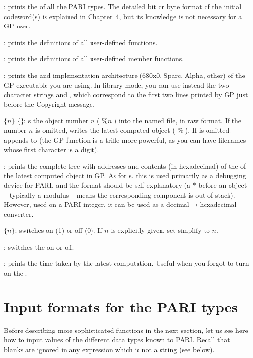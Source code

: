: prints the  of all the PARI
types. The detailed bit or byte format of the initial codeword(s) is
explained in Chapter~4, but its knowledge is not necessary for a GP user.

: prints the definitions of all user-defined functions.

: prints the definitions of all user-defined member functions.

: prints the  and implementation architecture
(680x0, Sparc, Alpha, other) of the GP executable you are using. In library
mode, you can use instead the two character strings  and
, which correspond to the first two lines printed by GP just
before the Copyright message.

 $\{n\}$ $\{$$\}$: s the object number
$n$ ( $\%n$ ) into the named file, in raw format. If the number $n$ is
omitted, writes the latest computed object ( $\%$ ). If  is
omitted, appends to  (the GP function  is a trifle more
powerful, as you can have filenames whose first character is a digit).

: prints the complete tree with addresses and contents (in
hexadecimal) of the  of the latest computed
object in GP. As for \b{s}, this is used primarily as a debugging device for
PARI, and the format should be self-explanatory (a $*$ before an object --
typically a modulus -- means the corresponding component is out of stack).
However, used on a PARI integer, it can be used as a
decimal$\rightarrow$hexadecimal converter.

 $\{n\}$: switches  on (1) or off (0). If $n$
is explicitly given, set simplify to $n$.

\subseckbd{\#}: switches the  on or off.

\subseckbd{\#\#}: prints the time taken by the latest computation.
Useful when you forgot to turn on the .

\section{Input formats for the PARI types}

\noindent
Before describing more sophisticated functions in the next section, let us
see here how to input values of the different data types known to PARI.
Recall that blanks are ignored in any expression which is not a string (see
below).

